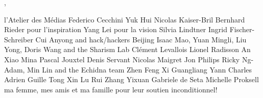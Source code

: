 
, 

l'Atelier des Médias
Federico Cecchini
Yuk Hui
Nicolas Kaiser-Bril 
Bernhard Rieder pour l'inspiration
Yang Lei pour la vision
Silvia Lindtner
Ingrid Fischer-Schreiber
Cui Anyong and hack/hackers Beijing
Isaac Mao, Yuan Mingli, Liu Yong, Doris Wang and the Sharism Lab
Clément Levallois
Lionel Radisson
An Xiao Mina
Pascal Jouxtel
Denis Servant
Nicolas Maigret
Jon Philips
Ricky Ng-Adam, Min Lin and the Echidna team
Zhen Feng
Xi Guangliang
Yann Charles
Adrien Guille
Tong Xin
Lu Rui
Zhang Yixuan
Gabriele de Seta
Michelle Proksell
ma femme, mes amis et ma famille pour leur soutien inconditionnel!
